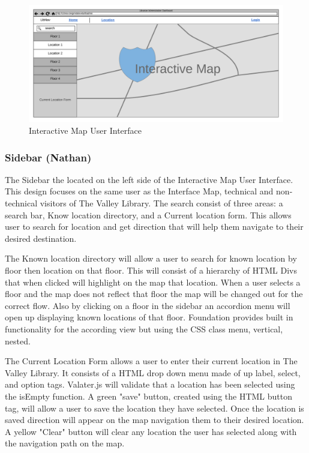 \documentclass[letterpaper,10pt,titlepage, onecolumn, compsoc]{IEEEtran}
\begin{document}
\begin{figure}[h!]
\centering
\includegraphics[scale=.45\textwidth,natwidth=4050,natheight=1868]{images/interactive-map.png}
\caption{Interactive Map User Interface}
\label{fig:method}
\end{figure}

\subsubsection{Sidebar (Nathan)}
The Sidebar the located on the left side of the Interactive Map User Interface. This design focuses on the same user as the Interface Map, technical and non-technical visitors of The Valley Library. The search consist of three areas: a search bar, Know location directory, and a Current location form. This allows user to search for location and get direction that will help them navigate to their desired destination. 

The Known location directory will allow a user to search for known location by floor then location on that floor. This will consist of a hierarchy of HTML Divs that when clicked will highlight on the map that location. When a user selects a floor and the map does not reflect that floor the map will be changed out for the correct flow. Also by clicking on a floor in the sidebar an accordion menu will open up displaying known locations of that floor. Foundation provides built in functionality for the according view but using the CSS class menu, vertical, nested.

The Current Location Form allows a user to enter their current location in The Valley Library. It consists of a HTML drop down menu made of up label, select, and option tags. Valater.js will validate that a location has been selected using the isEmpty function.  A green "save" button, created using the HTML button tag, will allow a user to save the location they have selected. Once the location is saved direction will appear on the map navigation them to their desired location. A yellow "Clear" button will clear any location the user has selected along with the navigation path on the map.
\end{document}
